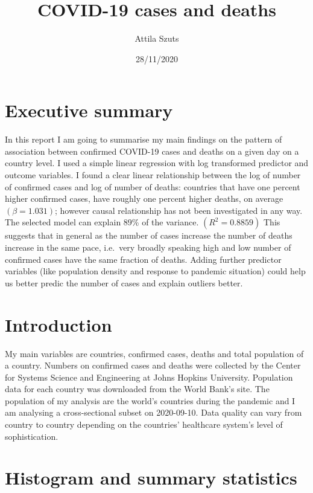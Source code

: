 \documentclass[
]{article}
\title{COVID-19 cases and deaths}
\author{Attila Szuts}
\date{28/11/2020}
\begin{document}
\maketitle

{
\setcounter{tocdepth}{2}
\tableofcontents
}
\newpage

\hypertarget{executive-summary}{%
\section{Executive summary}\label{executive-summary}}

In this report I am going to summarise my main findings on the pattern
of association between confirmed COVID-19 cases and deaths on a given
day on a country level. I used a simple linear regression with log
transformed predictor and outcome variables. I found a clear linear
relationship between the log of number of confirmed cases and log of
number of deaths: countries that have one percent higher confirmed
cases, have roughly one percent higher deaths, on average
\((\beta=1.031)\); however causal relationship has not been investigated
in any way. The selected model can explain 89\% of the variance.
\((R^2=0.8859)\) This suggests that in general as the number of cases
increase the number of deaths increase in the same pace, i.e.~very
broadly speaking high and low number of confirmed cases have the same
fraction of deaths. Adding further predictor variables (like population
density and response to pandemic situation) could help us better predic
the number of cases and explain outliers better.

\hypertarget{introduction}{%
\section{Introduction}\label{introduction}}

My main variables are countries, confirmed cases, deaths and total
population of a country. Numbers on confirmed cases and deaths were
collected by the Center for Systems Science and Engineering at Johns
Hopkins University. Population data for each country was downloaded from
the World Bank's site. The population of my analysis are the world's
countries during the pandemic and I am analysing a cross-sectional
subset on 2020-09-10. Data quality can vary from country to country
depending on the countries' healthcare system's level of sophistication.

\hypertarget{histogram-and-summary-statistics}{%
\section{Histogram and summary
statistics}\label{histogram-and-summary-statistics}}
\end{document}
